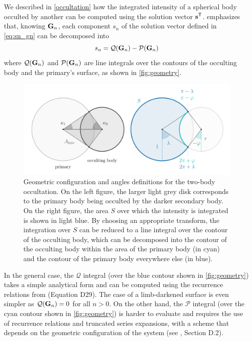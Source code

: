 \documentclass[modern]{aastex631}
\begin{document}
We described in \autoref{occultation} how the integrated intensity of a spherical body occulted by another can be computed using the solution vector ${\mathbf{s}}^\mathsf{T}$. \cite{pal2012} emphasizes that, knowing ${\mathbf{G}}_n$, each component $s_n$ of the solution vector defined in \autoref{eq:sn_gn} can be decomposed into
\begin{equation}
    s_n = \mathcal{Q}(\bvec{G}_n) - \mathcal{P}(\bvec{G}_n)
\end{equation}
where $\mathcal{Q}({\mathbf{G}}_n)$ and $\mathcal{P}({\mathbf{G}}_n)$ are line integrals over the contours of the occulting body and the primary's surface, as shown in \autoref{fig:geometry}.
%
\begin{figure}[H]
    \begin{center}
        \includegraphics[width=\textwidth]{../workflows/geometry/figures/occultation_geometry.pdf}
        \caption{Geometric configuration and angles definitions for the two-body occultation. On the left figure, the larger light grey disk corresponds to the primary body being occulted by the darker secondary body. On the right figure, the area $S$ over which the intensity is integrated is shown in light blue. By choosing an appropriate transform, the integration over $S$ can be reduced to a line integral over the contour of the occulting body, which can be decomposed into the contour of the occulting body within the area of the primary body (in cyan) and the contour of the primary body everywhere else (in blue). }
        \label{fig:geometry}
    \end{center}
\end{figure}
%
In the general case, the $\mathcal{Q}$ integral (over the blue contour shown in \autoref{fig:geometry}) takes a simple analytical form and can be computed using the recurrence relations from \cite{starry} (Equation D29). The case of a limb-darkened surface is even simpler as $\mathcal{Q}({\mathbf{G}}_n) = 0$ for all $n > 0$. On the other hand, the $\mathcal{P}$ integral (over the cyan contour shown in \autoref{fig:geometry}) is harder to evaluate and requires the use of recurrence relations and truncated series expansions, with a scheme that depends on the geometric configuration of the system (see \citealt{starry}, Section D.2).\\\\
\end{document}
